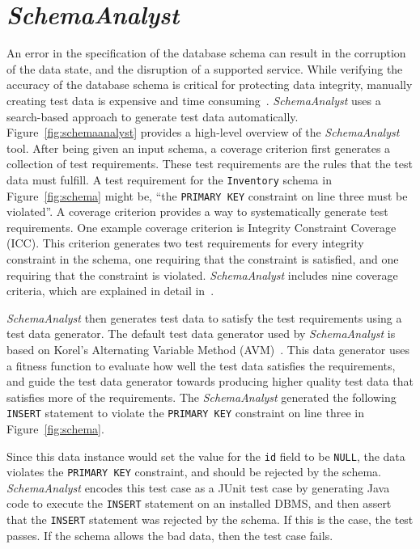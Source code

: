 \section{\textit{SchemaAnalyst}}\label{sec:technique}

An error in the specification of the database schema can result in the corruption of the
data state, and the disruption of a supported service.
While verifying the accuracy of the database schema is critical for protecting data integrity, manually
creating test data is expensive and time consuming~\cite{}. \textit{SchemaAnalyst} uses a search-based
approach to generate test data automatically. Figure~\ref{fig:schemaanalyst} provides a
high-level overview of the \textit{SchemaAnalyst} tool.
After being given an input schema, a coverage criterion first generates a collection of test 
requirements. These test requirements are the rules that
the test data must fulfill. A test requirement for the \texttt{Inventory} schema in
Figure~\ref{fig:schema} might be, ``the \texttt{PRIMARY KEY} constraint on line three must be
violated''. A coverage criterion provides a way to systematically generate test requirements. One
example coverage criterion is Integrity Constraint Coverage (ICC). This criterion generates two test
requirements for every integrity constraint in the schema, one requiring that the constraint is
satisfied, and one requiring that the constraint is violated. \textit{SchemaAnalyst} includes nine
coverage criteria, which are explained in detail in~\cite{mcminn2015effectiveness}.

\textit{SchemaAnalyst} then generates test data
to satisfy the test requirements using a test data generator. The default test data generator used by
\textit{SchemaAnalyst} is based on Korel's Alternating Variable Method (AVM)~\cite{Korel:AVM}.
This data generator uses a fitness function to evaluate how well the test data satisfies the
requirements, and guide the test data generator towards producing higher quality test data that
satisfies more of the requirements. The \textit{SchemaAnalyst} generated the following \texttt{INSERT}
statement to violate the \texttt{PRIMARY KEY} constraint on line three in Figure~\ref{fig:schema}.



Since this data instance would set the value for the \texttt{id} field to be \texttt{NULL},
the data violates the \texttt{PRIMARY KEY} constraint, and should be rejected by the schema.
\textit{SchemaAnalyst} encodes this test case as a JUnit test case by generating Java code to execute
the \texttt{INSERT} statement on an installed DBMS, and then assert that the \texttt{INSERT} statement
was rejected by the schema. If this is the case, the test passes.  If the schema allows the bad data,
then the test case fails.


